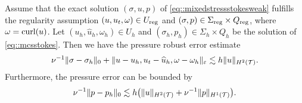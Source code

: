 \begin{theorem}
  \label{lemma::mcs_apr_error} Assume
  that the exact solution $(\sigma, u,p)$ of
  \eqref{eq::mixedstressstokesweak} fulfills the regularity assumption
  $(u, u_t, \omega) \in U_{\operatorname{reg}} $ and $(\sigma, p) \in \Sigma_{\operatorname{reg}} \times
  Q_{\operatorname{reg}}$, where $\omega = \operatorname{curl}(u)$. Let $(u_h, \hat u_h, \omega_h)
  \in U_h$ and $(\sigma_h,p_h) \in \Sigma_h \times Q_h$ be the
  solution of \eqref{eq::mcsstokes}. Then we have  the pressure robust  error estimate 
  \begin{align}
    \nu^{-1}\|\sigma - \sigma_h\|_0
    + \|u-u_h, u_t - \widehat{u}_h, \omega  -  \omega_h\|_{\varepsilon} 
    \lesssim h \|u\|_{H^2(\mathcal{T})} . \label{eq::mcs_apr_error_pres}
  \end{align}
Furthermore, the pressure error can be bounded by
\begin{align} \label{eq::mcs_apr_error_pres-2}
  \nu^{-1}\|p - p_h\|_0 \lesssim h \big(\|u\|_{H^2(\mathcal{T})} + \nu^{-1}\|p\|_{H^1(\mathcal{T})}\big).
\end{align}
\end{theorem}
